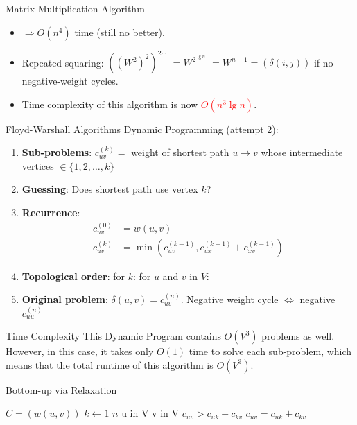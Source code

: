 \documentclass[aspectratio=169]{beamer}
\begin{document}
\begin{frame}{Matrix Multiplication Algorithm}
    \begin{itemize}
        \item $\Rightarrow O(n^4)$ time (still no better). \pause
        \item Repeated squaring: $((W^2)^2)^{2 \cdots}$ \pause $= W^{2^{\lg n}}$ \pause $= W^{n - 1} = (\delta(i, j))$ if no negative-weight cycles. \pause
        \item Time complexity of this algorithm is now \textcolor{red}{$O(n^3 \lg n)$}.
    \end{itemize}
\end{frame}

\begin{frame}{Floyd-Warshall Algorithms}
    Dynamic Programming (attempt 2):
    \begin{enumerate}
        \item \textbf{Sub-problems}: $c_{uv}^{(k)} =$ weight of shortest path $u \rightarrow v$ whose intermediate vertices $\in \{1,2, \ldots, k\}$ \pause
        \item \textbf{Guessing}:  \pause Does shortest path use vertex $k$? \pause
        \item \textbf{Recurrence}:
        \begin{equation*}
            \begin{align*}
                c_{uv}^{(0)} &= w(u, v) \\
                c_{uv}^{(k)} &= \min(c_{uv}^{(k-1)}, c_{ux}^{(k-1)} + c_{xv}^{(k-1)})
            \end{align*}
        \end{equation*}  \pause
        \item \textbf{Topological order}: for $k$: for $u$ and $v$ in $V$:
        \item \textbf{Original problem}: $\delta(u, v) = c_{uv}^{(n)}$. Negative weight cycle $\Leftrightarrow$ negative $c_{uu}^{(n)}$
    \end{enumerate}
\end{frame}

\begin{frame}{Time Complexity}
    This Dynamic Program contains $O(V^3)$ problems as well. However, in this case, it takes only $O(1)$ time to solve each sub-problem, which means that the total runtime of this algorithm is $O(V^3)$.
\end{frame}

\begin{frame}{Bottom-up via Relaxation}
    \begin{codebox}
        \li $C = (w(u, v))$
        \li \For $k \gets 1$ \To $n$
        \li \hspace{0.5cm} \For u in V
        \li \hspace{1.0cm} \For v in V
        \li \hspace{1.5cm} \If $c_{uv} > c_{uk} + c_{kv}$
        \li \hspace{2.0cm} $c_{uv} = c_{uk} + c_{kv}$
    \end{codebox}
\end{frame}
\end{document}

